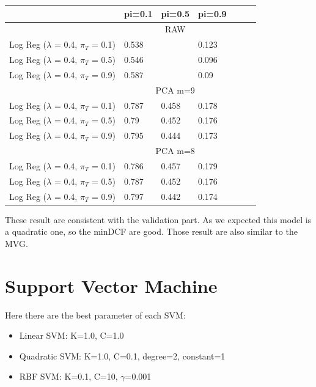 \documentclass[english]{report}
\begin{document}
\begin{table}[H]
    \centering
    \begin{tabular}{lllllll}
        \toprule
                                & pi=0.1 & pi=0.5 & pi=0.9 \\ \midrule
                                & \multicolumn{3}{c}{RAW}  \\
    Log Reg ($\lambda$ = 0.4, $\pi_T$ = 0.1)   & 0.538      & \color{red}{0.292}      & 0.123      \\
    Log Reg ($\lambda$ = 0.4, $\pi_T$ = 0.5)   & 0.546      & \color{red}{0.277}      & 0.096       \\
    Log Reg ($\lambda$ = 0.4, $\pi_T$ = 0.9)   & 0.587      & \color{red}{0.28}      & 0.09      \\ \midrule
                                & \multicolumn{3}{c}{PCA m=9}  \\
    Log Reg ($\lambda$ = 0.4, $\pi_T$ = 0.1)   & 0.787      & 0.458       & 0.178       \\
    Log Reg ($\lambda$ = 0.4, $\pi_T$ = 0.5)   & 0.79       & 0.452      & 0.176          \\
    Log Reg ($\lambda$ = 0.4, $\pi_T$ = 0.9)   & 0.795      & 0.444      & 0.173      \\ \midrule
                                & \multicolumn{3}{c}{PCA m=8}  \\
    Log Reg ($\lambda$ = 0.4, $\pi_T$ = 0.1)   & 0.786      & 0.457       & 0.179       \\
    Log Reg ($\lambda$ = 0.4, $\pi_T$ = 0.5)   & 0.787      & 0.452      & 0.176      \\
    Log Reg ($\lambda$ = 0.4, $\pi_T$ = 0.9)   & 0.797      & 0.442      & 0.174      \\
    \bottomrule
    \end{tabular}
    \label{tab:QuadLogReg_eval}
\end{table}
These result are consistent with the validation part. As we expected this model is a quadratic one, so the minDCF are good. Those result
are also similar to the MVG.

\newpage

\section{Support Vector Machine}
Here there are the best parameter of each SVM:
\begin{itemize}
    \item Linear SVM: K=1.0, C=1.0
    \item Quadratic SVM: K=1.0, C=0.1, degree=2, constant=1
    \item RBF SVM: K=0.1, C=10, $\gamma$=0.001
\end{itemize}
\end{document}
